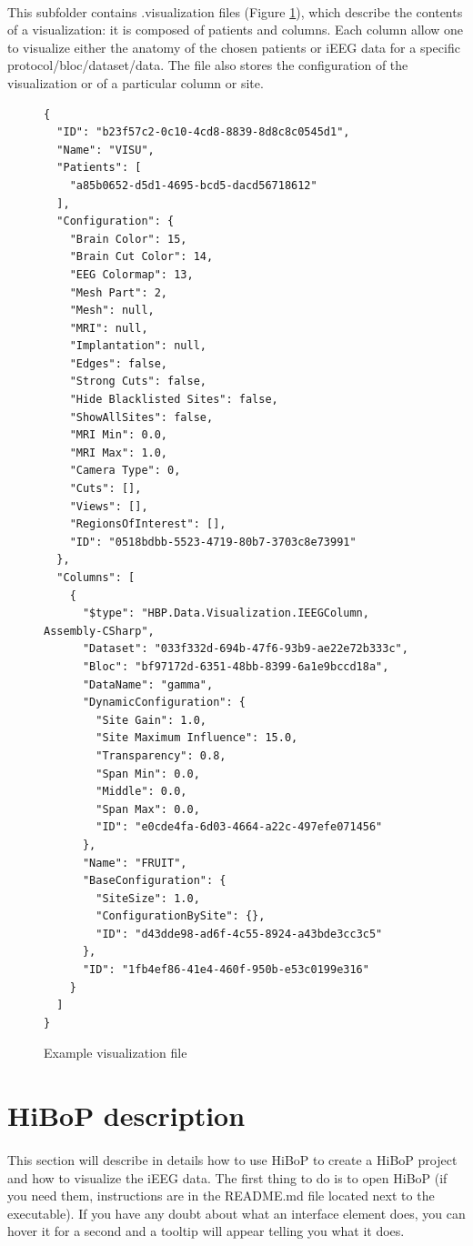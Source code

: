 \documentclass[a4paper]{article}
\begin{document}
\paragraph{} This subfolder contains .visualization files (Figure \ref{visualizationFile}), which describe the contents of a visualization: it is composed of patients and columns. Each column allow one to visualize either the anatomy of the chosen patients or iEEG data for a specific protocol/bloc/dataset/data. The file also stores the configuration of the visualization or of a particular column or site.
\begin{figure}[H]
\begin{lstlisting}
{
  "ID": "b23f57c2-0c10-4cd8-8839-8d8c8c0545d1",
  "Name": "VISU",
  "Patients": [
    "a85b0652-d5d1-4695-bcd5-dacd56718612"
  ],
  "Configuration": {
    "Brain Color": 15,
    "Brain Cut Color": 14,
    "EEG Colormap": 13,
    "Mesh Part": 2,
    "Mesh": null,
    "MRI": null,
    "Implantation": null,
    "Edges": false,
    "Strong Cuts": false,
    "Hide Blacklisted Sites": false,
    "ShowAllSites": false,
    "MRI Min": 0.0,
    "MRI Max": 1.0,
    "Camera Type": 0,
    "Cuts": [],
    "Views": [],
    "RegionsOfInterest": [],
    "ID": "0518bdbb-5523-4719-80b7-3703c8e73991"
  },
  "Columns": [
    {
      "$type": "HBP.Data.Visualization.IEEGColumn, Assembly-CSharp",
      "Dataset": "033f332d-694b-47f6-93b9-ae22e72b333c",
      "Bloc": "bf97172d-6351-48bb-8399-6a1e9bccd18a",
      "DataName": "gamma",
      "DynamicConfiguration": {
        "Site Gain": 1.0,
        "Site Maximum Influence": 15.0,
        "Transparency": 0.8,
        "Span Min": 0.0,
        "Middle": 0.0,
        "Span Max": 0.0,
        "ID": "e0cde4fa-6d03-4664-a22c-497efe071456"
      },
      "Name": "FRUIT",
      "BaseConfiguration": {
        "SiteSize": 1.0,
        "ConfigurationBySite": {},
        "ID": "d43dde98-ad6f-4c55-8924-a43bde3cc3c5"
      },
      "ID": "1fb4ef86-41e4-460f-950b-e53c0199e316"
    }
  ]
}
\end{lstlisting}
\caption{\label{visualizationFile}Example visualization file}
\end{figure}
\section{HiBoP description}\label{UI}
\paragraph{} This section will describe in details how to use HiBoP to create a HiBoP project and how to visualize the iEEG data. The first thing to do is to open HiBoP (if you need them, instructions are in the README.md file located next to the executable). If you have any doubt about what an interface element does, you can hover it for a second and a tooltip will appear telling you what it does.
\end{document}
